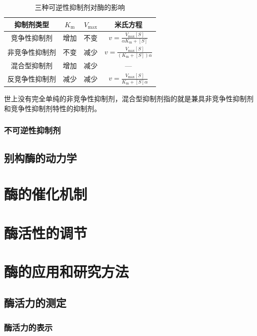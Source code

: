 \begin{table}[htbp]
	\centering
	\begin{tabularx}{\textwidth}{|c|C|C|C|}
		\hline
		\textbf{抑制剂类型} & \textbf{$K_{\text{m}}$} & \textbf{$V_{\text{max}}$} & \textbf{米氏方程} \\ \hline
		竞争性抑制剂 & 增加 & 不变 & $v = \frac{V_{\text{max}} [S]}{\alpha K_{\text{m}} + [S]}$ \\ \hline
		非竞争性抑制剂 & 不变 & 减少 & $v = \frac{V_{\text{max}} [S]}{(K_{\text{m}} + [S])\alpha}$ \\ \hline
		混合型抑制剂 & 增加 & 减少 & --- \\ \hline
		反竞争性抑制剂 & 减少 & 减少 & $v = \frac{V_{\text{max}} [S]}{K_{\text{m}} + [S]\alpha}$ \\ \hline
	\end{tabularx}
	\caption{三种可逆性抑制剂对酶的影响}
	\label{tab:三种可逆性抑制剂对酶的影响}
\end{table}

世上没有完全单纯的非竞争性抑制剂，混合型抑制剂指的就是兼具非竞争性抑制剂和竞争性抑制剂特性的抑制剂。

\subsubsection{不可逆性抑制剂}

\subsection{别构酶的动力学}

\section{酶的催化机制}

\section{酶活性的调节}

\section{酶的应用和研究方法}

\subsection{酶活力的测定}

\subsubsection{酶活力的表示}

